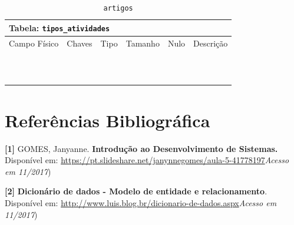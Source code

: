\documentclass[12pt,a4paper]{article}
\begin{document}
\begin{center}
\begin{table}[h!]
	\caption{\texttt{artigos}}
	\label{tabela:artigos}
	\begin{tabular}{|p{2.5cm}|p{1cm}|p{1.25cm}|p{1.75cm}|p{1.25cm}|p{5cm}|}\hline	
		\multicolumn{6}{|p{16cm}|}{\cellcolor{cinzaClaro}  \centering Tabela: \texttt{tipos\_atividades}} \\ \hline %
		{\small Campo Físico}   & {\small Chaves} & {\small Tipo} & {\small Tamanho} & {\small Nulo} & {\small Descrição}\\\hline %
		
		{\tiny } & {\tiny } & {\tiny } & {\tiny } & {\tiny } &{\tiny }\\\hline
		{\tiny } & {\tiny } & {\tiny } & {\tiny } & {\tiny } &{\tiny }\\\hline
		{\tiny } & {\tiny } & {\tiny } & {\tiny } & {\tiny } &{\tiny }\\\hline
		{\tiny } & {\tiny } & {\tiny } & {\tiny } & {\tiny } &{\tiny }\\\hline
		{\tiny } & {\tiny } & {\tiny } & {\tiny } & {\tiny } &{\tiny }\\\hline
		{\tiny } & {\tiny } & {\tiny } & {\tiny } & {\tiny } &{\tiny }\\\hline
		{\tiny } & {\tiny } & {\tiny } & {\tiny } & {\tiny } &{\tiny }\\\hline
		{\tiny } & {\tiny } & {\tiny } & {\tiny } & {\tiny } &{\tiny }\\\hline
		{\tiny } & {\tiny } & {\tiny } & {\tiny } & {\tiny } &{\tiny }\\\hline
		{\tiny } & {\tiny } & {\tiny } & {\tiny } & {\tiny } &{\tiny }\\\hline
		{\tiny } & {\tiny } & {\tiny } & {\tiny } & {\tiny } &{\tiny }\\\hline
			
	\end{tabular}
\end{table}	
\end{center}

\newpage
\section{Referências Bibliográfica}
\noindent \textbf{[1]} GOMES, Janyanne. \textbf{Introdução ao Desenvolvimento de Sistemas.} Disponível em: \url {https://pt.slideshare.net/janynnegomes/aula-5-41778197}\textit{Acesso em 11/2017})\\\vspace{0.2cm}

\noindent \textbf{[2]} \textbf{Dicionário de dados - Modelo de entidade e relacionamento}. Disponível em: \url{http://www.luis.blog.br/dicionario-de-dados.aspx}\textit{Acesso em 11/2017})\\\vspace{0.2cm}
\end{document}
